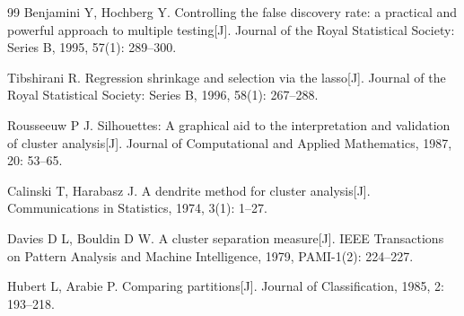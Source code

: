 \begin{thebibliography}{99}
Benjamini Y, Hochberg Y. Controlling the false discovery rate: a practical and powerful approach to multiple testing[J]. Journal of the Royal Statistical Society: Series B, 1995, 57(1): 289--300.

Tibshirani R. Regression shrinkage and selection via the lasso[J]. Journal of the Royal Statistical Society: Series B, 1996, 58(1): 267--288.

Rousseeuw P J. Silhouettes: A graphical aid to the interpretation and validation of cluster analysis[J]. Journal of Computational and Applied Mathematics, 1987, 20: 53--65.

Calinski T, Harabasz J. A dendrite method for cluster analysis[J]. Communications in Statistics, 1974, 3(1): 1--27.

Davies D L, Bouldin D W. A cluster separation measure[J]. IEEE Transactions on Pattern Analysis and Machine Intelligence, 1979, PAMI-1(2): 224--227.

Hubert L, Arabie P. Comparing partitions[J]. Journal of Classification, 1985, 2: 193--218.

\end{thebibliography}
